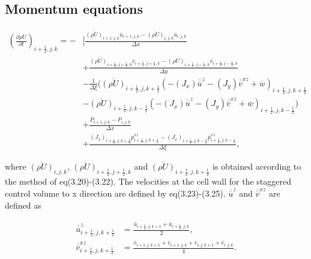 \subsection{Momentum equations}
\begin{align}
 \left(\frac{\partial \rho U}{\partial t}\right)_{i+\frac{1}{2},j,k}
 = - &\Bigg[ \frac{ \overline{(\rho U)}_{i+1,j,k} \overline{u}_{i+1,j,k}
                  - \overline{(\rho U)}_{i  ,j,k} \overline{u}_{i  ,j,k}
                  } {\Delta x} \nonumber \\
          &+ \frac{ \overline{(\rho U)}_{i+\frac{1}{2},j+\frac{1}{2},k} \overline{v}_{i+\frac{1}{2},j+\frac{1}{2},k}
                  - \overline{(\rho U)}_{i+\frac{1}{2},j-\frac{1}{2},k} \overline{v}_{i+\frac{1}{2},j-\frac{1}{2},k}
                  } {\Delta y} \nonumber \\
          &- \frac{1}{\Delta \xi} \Bigg( \overline{(\rho U)}_{i+\frac{1}{2},j,k+\frac{1}{2}} (-(J_{x}) \overline{\overline{u}}^{z} -(J_{y}) \overline{\overline{v}}^{xz} + \overline{w})_{i+\frac{1}{2},j,k+\frac{1}{2}} \nonumber \\
                                      &- \overline{(\rho U)}_{i+\frac{1}{2},j,k-\frac{1}{2}} (-(J_{x}) \overline{\overline{u}}^{z} -(J_{y}) \overline{\overline{v}}^{xz} + \overline{w})_{i+\frac{1}{2},j,k-\frac{1}{2}} \Bigg) \nonumber \\
          &+ \frac{ P_{i+1,j,k}-P_{i,j,k}}{\Delta x} \nonumber \\
          &+ \frac{ (J_{x})_{i+\frac{1}{2},j,k+\frac{1}{2}} \overline{p}^{xz}_{i+\frac{1}{2},j,k+\frac{1}{2}}
                  - (J_{x})_{i+\frac{1}{2},j,k-\frac{1}{2}} \overline{p}^{xz}_{i+\frac{1}{2},j,k-\frac{1}{2}}
                  } {\Delta \xi},
\end{align}

where $\overline{(\rho U)}_{i,j,k}$, $\overline{(\rho U)}_{i+\frac{1}{2},j+\frac{1}{2},k}$ 
and $\overline{(\rho U)}_{i+\frac{1}{2},j,k+\frac{1}{2}}$ is obtained according to the method of eq(3.20)-(3.22).
The velocities at the cell wall for the staggered control volume to x direction are defined by eq(3.23)-(3.25).
$\overline{\overline{u}}^z$ and $\overline{\overline{v}}^{xz}$ are defined as

\begin{align}
 \overline{\overline{u}}^z_{i+\frac{1}{2},j,k+\frac{1}{2}}    &= \frac{ \overline{u}_{i+\frac{1}{2},j,k+1}
                                                                      + \overline{u}_{i+\frac{1}{2},j,k  }
                                                                      } {2}, \\
 \overline{\overline{v}}^{xz}_{i+\frac{1}{2},j,k+\frac{1}{2}} &= \frac{ \overline{v}_{i+1,j,k+1}
                                                                      + \overline{v}_{i+1,j,k  }
                                                                      + \overline{v}_{i  ,j,k+1}
                                                                      + \overline{v}_{i  ,j,k  }
                                                                      } {4}.
\end{align}

